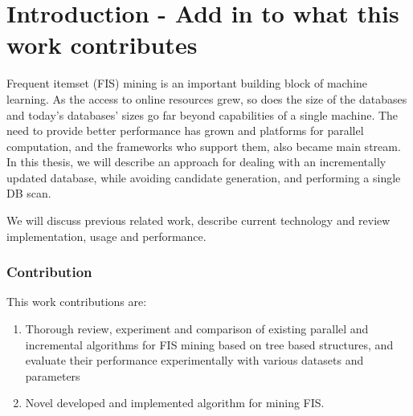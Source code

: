 \section{Introduction - Add in to what this work contributes}



Frequent itemset (FIS) mining is an important building block of machine learning. As the access to online resources grew, so does the size of the databases and today’s databases’ sizes go far beyond capabilities of a single machine. The need to provide better performance has grown and platforms for parallel computation, and the frameworks who support them, also became main stream.
In this thesis, we will describe an approach for dealing with an incrementally updated database, while avoiding candidate generation, and performing a single DB scan.

We will discuss previous related work, describe current technology and review implementation, usage and performance.

\subsubsection{Contribution}
This work contributions are:
\begin{enumerate}
\item Thorough review, experiment and comparison of existing parallel and incremental algorithms for FIS mining based on tree based structures, and evaluate their performance experimentally with various datasets and parameters
\item Novel developed and implemented algorithm for mining FIS.
\end{enumerate}

